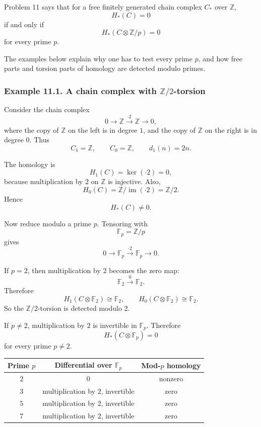\documentclass[12pt,a4paper]{article}
\theoremstyle{notespace}
\begin{document}
Problem 11 says that for a free finitely generated chain complex \(C_*\) over \(\mathbb Z\),
\[
H_*(C)=0
\]
if and only if
\[
H_*(C\otimes \mathbb Z/p)=0
\]
for every prime \(p\).

The examples below explain why one has to test every prime \(p\), and how free parts and torsion parts of homology are detected modulo primes.

\subsubsection*{Example 11.1. A chain complex with \(\mathbb Z/2\)-torsion}

Consider the chain complex
\[
0
\longrightarrow
\mathbb Z
\xrightarrow{\cdot 2}
\mathbb Z
\longrightarrow
0,
\]
where the copy of \(\mathbb Z\) on the left is in degree \(1\), and the copy of \(\mathbb Z\) on the right is in degree \(0\). Thus
\[
C_1=\mathbb Z,
\qquad
C_0=\mathbb Z,
\qquad
d_1(n)=2n.
\]

The homology is
\[
H_1(C)=\ker(\cdot 2)=0,
\]
because multiplication by \(2\) on \(\mathbb Z\) is injective. Also,
\[
H_0(C)
=
\mathbb Z/\operatorname{im}(\cdot 2)
=
\mathbb Z/2.
\]
Hence
\[
H_*(C)\neq 0.
\]

Now reduce modulo a prime \(p\). Tensoring with
\[
\mathbb F_p=\mathbb Z/p
\]
gives
\[
0
\longrightarrow
\mathbb F_p
\xrightarrow{\cdot 2}
\mathbb F_p
\longrightarrow
0.
\]

If \(p=2\), then multiplication by \(2\) becomes the zero map:
\[
\mathbb F_2
\xrightarrow{0}
\mathbb F_2.
\]
Therefore
\[
H_1(C\otimes \mathbb F_2)\cong \mathbb F_2,
\qquad
H_0(C\otimes \mathbb F_2)\cong \mathbb F_2.
\]
So the \(\mathbb Z/2\)-torsion is detected modulo \(2\).

If \(p\neq 2\), multiplication by \(2\) is invertible in \(\mathbb F_p\). Therefore
\[
H_*(C\otimes \mathbb F_p)=0
\]
for every prime \(p\neq 2\).

\begin{center}
	\begin{tabular}{c|c|c}
		\textbf{Prime \(p\)} & \textbf{Differential over \(\mathbb F_p\)} & \textbf{Mod-\(p\) homology}\\
		\hline
		\(2\) & \(0\) & nonzero\\
		\(3\) & multiplication by \(2\), invertible & zero\\
		\(5\) & multiplication by \(2\), invertible & zero\\
		\(7\) & multiplication by \(2\), invertible & zero
	\end{tabular}
\end{center}
\end{document}
